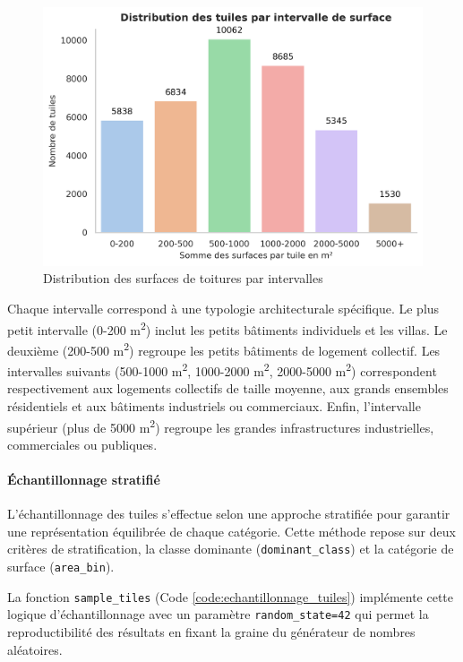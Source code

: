 \begin{figure}[H]
    \centering
    \includegraphics[width=1\linewidth]{02-main/figures/ch3/ch3_selection_donnees_02_taille_bin.png}
    \caption{Distribution des surfaces de toitures par intervalles}
    \label{fig:ch3_selection_donnees_02_taille_bin}
\end{figure}

Chaque intervalle correspond à une typologie architecturale spécifique. Le plus petit intervalle (0-200 \si{\unit{\square\meter}}) inclut les petits bâtiments individuels et les villas. Le deuxième (200-500 \si{\unit{\square\meter}}) regroupe les petits bâtiments de logement collectif. Les intervalles suivants (500-1000 \si{\unit{\square\meter}}, 1000-2000 \si{\unit{\square\meter}}, 2000-5000 \si{\unit{\square\meter}}) correspondent respectivement aux logements collectifs de taille moyenne, aux grands ensembles résidentiels et aux bâtiments industriels ou commerciaux. Enfin, l'intervalle supérieur (plus de 5000 \si{\unit{\square\meter}}) regroupe les grandes infrastructures industrielles, commerciales ou publiques.

\newpage
\paragraph{Échantillonnage stratifié}
L'échantillonnage des tuiles s'effectue selon une approche stratifiée pour garantir une représentation équilibrée de chaque catégorie. Cette méthode repose sur deux critères de stratification, la classe dominante (\texttt{dominant\_class}) et la catégorie de surface (\texttt{area\_bin}). 

La fonction \texttt{sample\_tiles} (Code \ref{code:echantillonnage_tuiles}) implémente cette logique d'échantillonnage avec un paramètre \texttt{random\_state=42} qui permet la reproductibilité des résultats en fixant la graine du générateur de nombres aléatoires.

